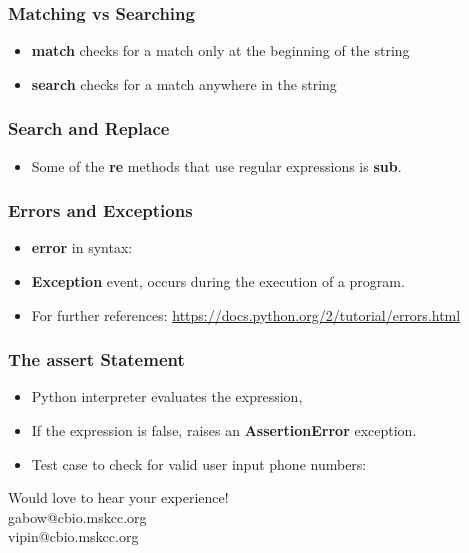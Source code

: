 \documentclass[11pt]{beamer}
\makeatletter
\newcommand{\thankyou}
{\begin{center} Would love to hear your experience! \\ gabow@cbio.mskcc.org \\ vipin@cbio.mskcc.org \end{center}}
\makeatother
\begin{document}
\begin{frame}[plain]
    \frametitle{Matching vs Searching}
    \begin{itemize}
        \item[] \textbf{match} checks for a match only at the beginning of the string
        \pause
        \item[] \textbf{search} checks for a match anywhere in the string
        \newline
        \pause
        
    \end{itemize}
\end{frame}
\begin{frame}[plain]
    \frametitle{Search and Replace}
    \begin{itemize}
        \item[] Some of the \textbf{re} methods that use regular expressions is \textbf{sub}.
        \newline
        \pause
        
        \pause
        
    \end{itemize}
\end{frame}
\begin{frame}[plain]
    \frametitle{Errors and Exceptions}
    \begin{itemize}
        \item[] \textbf{error} in syntax:
        
        \pause
        \item[] \textbf{Exception} event, occurs during the execution of a program.
        
        \pause
        \item[] For further references: \url{https://docs.python.org/2/tutorial/errors.html} 
    \end{itemize}
\end{frame}
\begin{frame}[plain]
    \frametitle{The \textbf{assert} Statement}
    \begin{itemize}
        \item[] Python interpreter evaluates the expression,
        \item[] If the expression is false, raises an \textbf{AssertionError} exception.
        \newline
        \pause
        
        \pause
        \item[] Test case to check for valid user input phone numbers: 
        \newline
        
    \end{itemize}
\end{frame}
%
\begin{frame}[plain]
    \thankyou
\end{frame}
\end{document}
